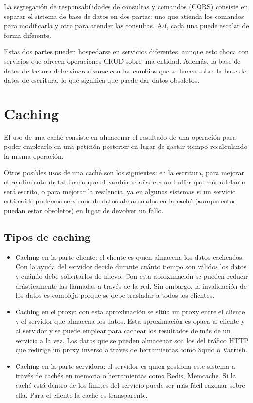 \documentclass[11pt,a4paper]{article}
\begin{document}
La segregación de responsabilidades de consultas y comandos (CQRS) consiste en separar el sistema de base de datos en dos partes: uno que atienda los comandos para modificarla y otro para atender las consultas. Así, cada una puede escalar de forma diferente. 

Estas dos partes pueden hospedarse en servicios diferentes, aunque esto choca con servicios que ofrecen operaciones CRUD sobre una entidad. Además, la base de datos de lectura debe sincronizarse con los cambios que se hacen sobre la base de datos de escritura, lo que significa que puede dar datos obsoletos.

\section{Caching}

El uso de una caché consiste en almacenar el resultado de una operación para poder emplearlo en una petición posterior en lugar de gastar tiempo recalculando la misma operación. 

Otros posibles usos de una caché son los siguientes: en la escritura, para mejorar el rendimiento de tal forma que el cambio se añade a un buffer que más adelante será escrito, o para mejorar la resilencia, ya en algunos sistemas si un servicio está caído podemos servirnos de datos almacenados en la caché (aunque estos puedan estar obsoletos) en lugar de devolver un fallo.

\subsection{Tipos de caching}

\begin{itemize}

\item Caching en la parte cliente: el cliente es quien almacena los datos cacheados. Con la ayuda del servidor decide durante cuánto tiempo son válidos los datos y cuándo debe solicitarlos de nuevo. Con esta aproximación se pueden reducir drásticamente las llamadas a través de la red. Sin embargo, la invalidación de los datos es compleja porque se debe trasladar a todos los clientes.

\item Caching en el proxy: con esta aproximación se sitúa un proxy entre el cliente y el servidor que almacena los datos. Esta aproximación es opaca al cliente y al servidor y se puede emplear para cachear los resultados de más de un servicio a la vez. Los datos que se pueden almacenar son los del tráfico HTTP que redirige un proxy inverso a través de herramientas como Squid o Varnish.

\item Caching en la parte servidora: el servidor es quien gestiona este sistema a través de cachés en memoria o herramientas como Redis, Memcache. Si la caché está dentro de los límites del servicio puede ser más fácil razonar sobre ella. Para el cliente la caché es transparente.

\end{itemize}
\end{document}
